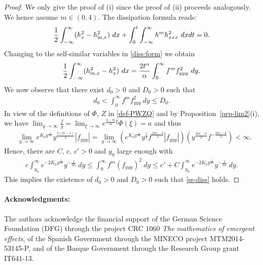 \documentclass{article}%
\newcommand{\alp}{\alpha}
\begin{document}
\begin{proof} 
We only give the proof of (i) since the proof of (ii) proceeds analogously. 
We hence assume $m \in (0,4)$. The dissipation formula reads:
  \begin{equation}\label{diss:form}
    \frac{1}{2}\int_{-\infty}^\infty (h_x^2 - h_{{\rm in},x}^2) \ dx +
 \int_0^t\int_{-\infty}^{\infty} h^m h_{xxx}^2 \ dx  dt = 0.
  \end{equation}
Changing to the self-similar variables in \eqref{diss:form} we obtain
\begin{align*}
 \frac{1}{2}\int_{-\infty}^\infty (h_{{\rm in},x}^2 - h_x^2) \ dx = 
    \frac{2t^{\alp}}{\alp} \int_{0}^{\infty  } f^m f_{yyy}^2 \ dy.
\end{align*}
We now observe that there exist $d_0>0$ and $D_0>0$ such that
\begin{align*}
    d_0 <\int_{0}^{\infty} f^m f_{yyy}^2 \ dy\leq D_0.
\end{align*}
In view of the definitions of $\Phi$, $Z$ in \eqref{def-PWZQ} and by
Proposition~\ref{prp-lim2}(i), we have $\lim_{y \to \infty} \frac{f}{y} = 
\lim_{\xi \to \infty} e^{\frac{4-m}{m}\xi}\Phi(\xi) = a$ and thus
  \begin{align*}
    &\lim_{y\to \infty} e^{K_0y^{\frac{1}{3\alp}}}y^{\frac{2(m-1)}{3}}|f_{yyy}| = %
    \lim_{y \to \infty} (e^{K_0y^{\frac{1}{3\alp}}} y^{\frac{1}{3}}f^{\frac{2m-3}{3}}|f_{yyy}|) 
(y^{\frac{2m-3}{3}}f^{-\frac{2m-3}{3}}) < \infty.
  \end{align*}
Hence, there are $C$, $c$, $c'>0$ and $y_0$ large enough with
\begin{align*}
        c \int_{y_0}^{\infty} e^{-2K_0y^{\frac{1}{3\alp}}}y^{-\frac{1}{3\alp} }\ dy \leq
 \int_{0}^{\infty} f^m(f_{yyy})^2\ dy \leq 
c'+ C \int_{y_0}^{\infty} e^{-2K_0y^{\frac{1}{3\alp}}}y^{-\frac{1}{3\alp} }\ dy.
 \end{align*}
This implies the existence of $d_0>0$ and $D_0>0$ such that
 \eqref{ss-diss} holds.
 \end{proof}

\medskip

\paragraph{Acknowledgments:} The authors acknowledge the financial support of the German Science Foundation 
(DFG) through the project CRC 1060 {\it The mathematics of emergent effects}, of the Spanish Government 
through the MINECO project MTM2014-53145-P, and of the Basque Government through the Research Group grant
 IT641-13.
\end{document}
